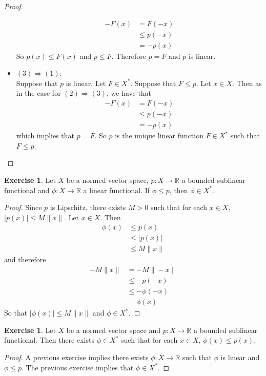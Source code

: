 \documentclass[12pt]{amsart}
\theoremstyle{definition}
\theoremstyle{remark}
\theoremstyle{definition}
\newtheorem{ex}[definition]{Exercise}
\newcommand{\R}{\mathbb{R}}
\begin{document}
\begin{proof}
\begin{itemize}
\begin{align*}
	-F(x) 
	&= F(-x) \\
	& \leq p(-x) \\
	&= -p(x)
\end{align*}	
	So $p(x) \leq F(x)$ and $p \leq F$. Therefore $p = F$ and $p$ is linear.  
	\item $(3) \Rightarrow (1)$: \\ 
	Suppose that $p$ is linear. Let $F \in X^*$. Suppose that $F \leq p$. Let $x \in X$. Then as in the case for $(2) \Rightarrow (3)$, we have that
	\begin{align*}
	-F(x) 
	&= F(-x) \\
	& \leq p(-x) \\
	&= -p(x)
	\end{align*}	 
	which implies that $p = F$. So $p$ is the unique linear function $F \in X^*$ such that $F \leq p$.
	\end{itemize}
	\end{proof}
	
	\begin{ex}
	Let $X$ be a normed vector space, $p:X \rightarrow \R$ a bounded sublinear functional and $\phi:X \rightarrow \R$ a linear functional. If $\phi \leq p$, then $\phi \in X^*$. 
	\end{ex}
	
	\begin{proof}
	Since $p$ is Lipschitz, there exists $M >0$ such that for each $x \in X$, $|p(x)| \leq M \|x\|$. Let $x \in X$. Then 
	\begin{align*}
	\phi(x) 
	&\leq p(x) \\
	&\leq |p(x)| \\
	&\leq M \|x\| 
	\end{align*}
	and therefore  
	\begin{align*}
	- M \|x\| 
	&= -M \|-x\| \\
	& \leq -p(-x) \\
	& \leq - \phi(-x) \\
	&= \phi(x) 
	\end{align*}
	So that $|\phi(x)| \leq  M\|x\|$ and $\phi \in X^*$.
	\end{proof}
	
	\begin{ex}
	Let $X$ be a normed vector space and $p:X \rightarrow \R$ a bounded sublinear functional. Then there exists $\phi \in X^*$ such that for each $x \in X$, $\phi(x) \leq p(x)$.
	\end{ex}
	
	\begin{proof}
	A previous exercise implies there exists $\phi: X \rightarrow \R$ such that $\phi$ is linear and $\phi \leq p$. The previous exercise implies that $\phi \in X^*$.
	\end{proof}
	
\end{document}
